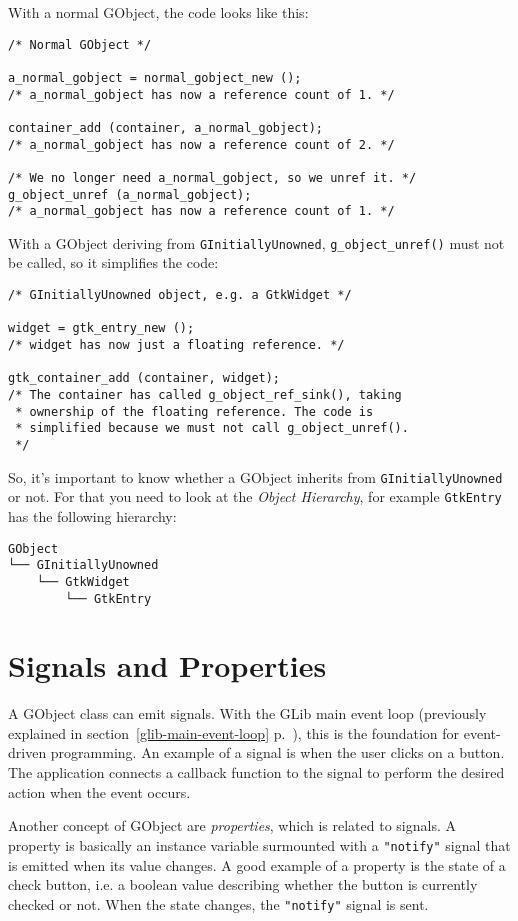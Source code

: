 With a normal GObject, the code looks like this:
\begin{lstlisting}
/* Normal GObject */

a_normal_gobject = normal_gobject_new ();
/* a_normal_gobject has now a reference count of 1. */

container_add (container, a_normal_gobject);
/* a_normal_gobject has now a reference count of 2. */

/* We no longer need a_normal_gobject, so we unref it. */
g_object_unref (a_normal_gobject);
/* a_normal_gobject has now a reference count of 1. */
\end{lstlisting}

With a GObject deriving from \lstinline{GInitiallyUnowned}, \lstinline{g_object_unref()} must not be called, so it simplifies the code:
\begin{lstlisting}
/* GInitiallyUnowned object, e.g. a GtkWidget */

widget = gtk_entry_new ();
/* widget has now just a floating reference. */

gtk_container_add (container, widget);
/* The container has called g_object_ref_sink(), taking
 * ownership of the floating reference. The code is
 * simplified because we must not call g_object_unref().
 */
\end{lstlisting}

So, it's important to know whether a GObject inherits from \lstinline{GInitiallyUnowned} or not. For that you need to look at the \emph{Object Hierarchy}, for example \lstinline{GtkEntry} has the following hierarchy:

\begin{verbatim}
GObject
└── GInitiallyUnowned
    └── GtkWidget
        └── GtkEntry
\end{verbatim}

\section{Signals and Properties}

A GObject class can emit signals. With the GLib main event loop (previously explained in section~\ref{glib-main-event-loop} p.~\pageref{glib-main-event-loop}), this is the foundation for event-driven programming. An example of a signal is when the user clicks on a button. The application connects a callback function to the signal to perform the desired action when the event occurs.

Another concept of GObject are \emph{properties}, which is related to signals. A property is basically an instance variable surmounted with a \lstinline{"notify"} signal that is emitted when its value changes. A good example of a property is the state of a check button, i.e. a boolean value describing whether the button is currently checked or not. When the state changes, the \lstinline{"notify"} signal is sent.

